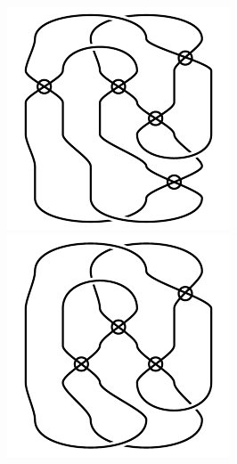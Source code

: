 \begin{figure}[H]
\begin{minipage}[b]{.18\linewidth}
\end{minipage}
\begin{minipage}[b]{.18\linewidth}
\centering
\includegraphics[width=\linewidth]{../data/virtual_4_59.png}
\end{minipage}
\begin{minipage}[b]{.18\linewidth}
\centering
\includegraphics[width=\linewidth]{../data/virtual_4_60.png}

\end{minipage}
\end{figure}
